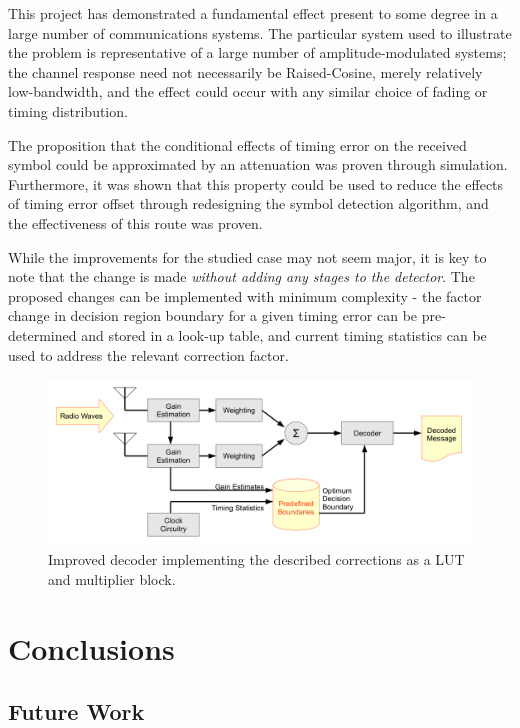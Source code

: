 This project has demonstrated a fundamental effect present to some degree in a large number of communications systems. The particular system used to illustrate the problem is representative of a large number of amplitude-modulated systems; the channel response need not necessarily be Raised-Cosine, merely relatively low-bandwidth, and the effect could occur with any similar choice of fading or timing distribution.

The proposition that the conditional effects of timing error on the received symbol could be approximated by an attenuation was proven through simulation. Furthermore, it was shown that this property could be used to reduce the effects of timing error offset through redesigning the symbol detection algorithm, and the effectiveness of this route was proven.

While the improvements for the studied case may not seem major, it is key to note that the change is made \emph{without adding any stages to the detector}. The proposed changes can be implemented with minimum complexity - the factor change in decision region boundary for a given timing error can be pre-determined and stored in a look-up table,  and current timing statistics can be used to address the relevant correction factor.

\begin{figure}[htbp]
\centering
\includegraphics[width=\linewidth]{system.png}
\caption[Improved decoder implementation]{Improved decoder implementing the described corrections as a LUT and multiplier block.}
\end{figure}


\part{Conclusions}

\chapter{Future Work}


